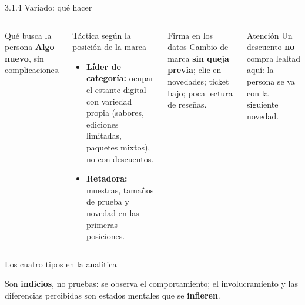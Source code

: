 \documentclass[aspectratio=169,xcolor=dvipsnames]{beamer}
\begin{document}
\begin{frame}{3.1.4 Variado: qué hacer}
\begin{columns}[T]
  \begin{block}{Qué busca la persona}
    \small \textbf{Algo nuevo}, sin complicaciones.
  \end{block}
  \begin{block}{Táctica según la posición de la marca}
    \small
    \begin{itemize}
      \item \textbf{Líder de categoría:} ocupar el estante digital con variedad propia (sabores, ediciones limitadas, paquetes mixtos), no con descuentos.
      \item \textbf{Retadora:} muestras, tamaños de prueba y novedad en las primeras posiciones.
    \end{itemize}
  \end{block}
  \begin{exampleblock}{Firma en los datos}
    \small Cambio de marca \textbf{sin queja previa}; clic en novedades; ticket bajo; poca lectura de reseñas.
  \end{exampleblock}
  \begin{alertblock}{Atención}
    \small Un descuento \textbf{no} compra lealtad aquí: la persona se va con la siguiente novedad.
  \end{alertblock}
\end{columns}
\end{frame}

\begin{frame}{Los cuatro tipos en la analítica}
\footnotesize
\begin{center}
\end{center}
\vspace{-4pt}
{\scriptsize Son \textbf{indicios}, no pruebas: se observa el comportamiento; el involucramiento y las diferencias percibidas son estados mentales que se \textbf{infieren}.}
\end{frame}
\end{document}
